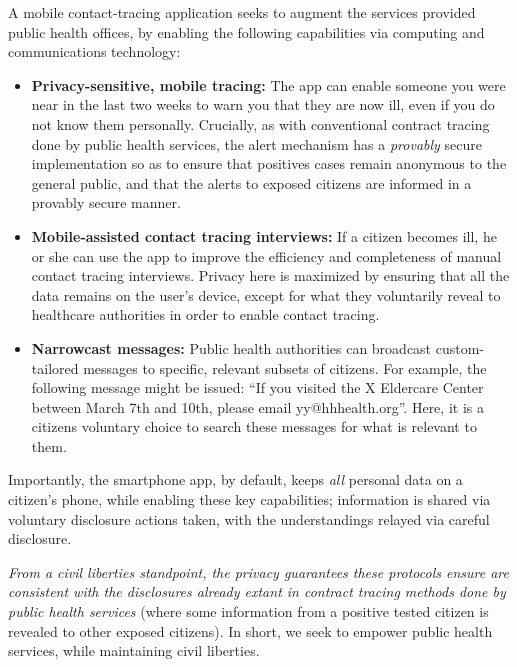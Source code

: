 \documentclass{article}
\begin{document}
A mobile contact-tracing application seeks to augment the services provided public health offices, by enabling the following capabilities via computing and communications technology:

\begin{itemize}
\item \textbf{Privacy-sensitive, mobile tracing:}  The app can enable someone you were near in the last two weeks to warn you that they are now ill, even if you do not know them personally.  Crucially, as with conventional contract tracing done by public health services, the alert mechanism has a \emph{provably} secure implementation so as to ensure that positives cases remain anonymous to the general public, and that the alerts to exposed citizens are informed in a provably secure manner.

\item \textbf{Mobile-assisted contact tracing interviews:}  If a citizen becomes ill, he or she can use the app to improve the efficiency and completeness of manual contact tracing interviews. Privacy here is maximized by ensuring that all the data remains on the user's device, except for what they voluntarily reveal to healthcare authorities in order to enable contact tracing.

\item \textbf{Narrowcast messages:}  Public health authorities can broadcast
  custom-tailored messages to specific, relevant subsets of citizens.  For example, the following message might be issued: ``If you visited
  the X Eldercare Center between March 7th and 10th, please email yy@hhhealth.org''.  Here, it is a citizens voluntary choice to search these messages for what is relevant to them.
  
\end{itemize}

Importantly, the smartphone app, by default, keeps \emph{all} personal data on a citizen's phone, while enabling these key capabilities; information is shared via voluntary disclosure actions taken, with the understandings relayed via careful disclosure. 

\emph{From a civil liberties standpoint, the privacy guarantees these protocols ensure are consistent with the disclosures already extant in contract tracing methods done by public health services} (where some information from a positive tested citizen is revealed to other exposed citizens). In short, we seek to empower public health services, while maintaining civil liberties.
 
\end{document}
